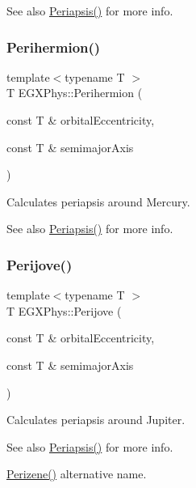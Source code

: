 \begin{DoxySeeAlso}{See also}
\mbox{\hyperlink{group___periapsis_ga4414ac75539371ec874a3d25cad6c9fe}{Periapsis()}} for more info. 
\end{DoxySeeAlso}
\mbox{\label{group___periapsis_ga9562e9cbfd73019ae9cdaa643b843d63}} 
\subsubsection{\texorpdfstring{Perihermion()}{Perihermion()}}
{\footnotesize\ttfamily template$<$typename T $>$ \\
T E\+G\+X\+Phys\+::\+Perihermion (\begin{DoxyParamCaption}\item[{const T \&}]{orbital\+Eccentricity,  }\item[{const T \&}]{semimajor\+Axis }\end{DoxyParamCaption})}



Calculates periapsis around Mercury. 

\begin{DoxySeeAlso}{See also}
\mbox{\hyperlink{group___periapsis_ga4414ac75539371ec874a3d25cad6c9fe}{Periapsis()}} for more info. 
\end{DoxySeeAlso}
\mbox{\label{group___periapsis_ga075052f7ff9aa1d5fdf4501b493be86b}} 
\subsubsection{\texorpdfstring{Perijove()}{Perijove()}}
{\footnotesize\ttfamily template$<$typename T $>$ \\
T E\+G\+X\+Phys\+::\+Perijove (\begin{DoxyParamCaption}\item[{const T \&}]{orbital\+Eccentricity,  }\item[{const T \&}]{semimajor\+Axis }\end{DoxyParamCaption})}



Calculates periapsis around Jupiter. 

\begin{DoxySeeAlso}{See also}
\mbox{\hyperlink{group___periapsis_ga4414ac75539371ec874a3d25cad6c9fe}{Periapsis()}} for more info. 

\mbox{\hyperlink{group___periapsis_ga0523c65b7fc26e675388b2c3d38aa00b}{Perizene()}} alternative name. 
\end{DoxySeeAlso}
\mbox{\label{group___periapsis_gaa56f74c44a3583b8f0d13b821c1d7422}} 
